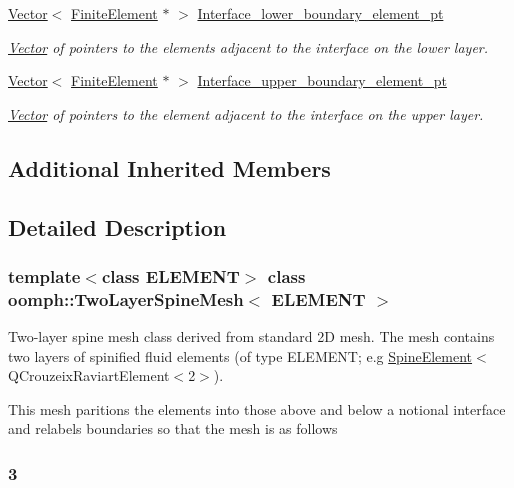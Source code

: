 \begin{DoxyCompactItemize}
\hyperlink{classoomph_1_1Vector}{Vector}$<$ \hyperlink{classoomph_1_1FiniteElement}{Finite\+Element} $\ast$ $>$ \hyperlink{classoomph_1_1TwoLayerSpineMesh_aaa5c2ad2f61cd7637b12573265b42bd7}{Interface\+\_\+lower\+\_\+boundary\+\_\+element\+\_\+pt}
\begin{DoxyCompactList}\small\item\em \hyperlink{classoomph_1_1Vector}{Vector} of pointers to the elements adjacent to the interface on the lower layer. \end{DoxyCompactList}\item 
\hyperlink{classoomph_1_1Vector}{Vector}$<$ \hyperlink{classoomph_1_1FiniteElement}{Finite\+Element} $\ast$ $>$ \hyperlink{classoomph_1_1TwoLayerSpineMesh_a81c2202c3169f9fe8c9342b5d95c1a9d}{Interface\+\_\+upper\+\_\+boundary\+\_\+element\+\_\+pt}
\begin{DoxyCompactList}\small\item\em \hyperlink{classoomph_1_1Vector}{Vector} of pointers to the element adjacent to the interface on the upper layer. \end{DoxyCompactList}\end{DoxyCompactItemize}
\subsection*{Additional Inherited Members}


\subsection{Detailed Description}
\subsubsection*{template$<$class E\+L\+E\+M\+E\+NT$>$\newline
class oomph\+::\+Two\+Layer\+Spine\+Mesh$<$ E\+L\+E\+M\+E\+N\+T $>$}

Two-\/layer spine mesh class derived from standard 2D mesh. The mesh contains two layers of spinified fluid elements (of type E\+L\+E\+M\+E\+NT; e.\+g \hyperlink{classoomph_1_1SpineElement}{Spine\+Element}$<$Q\+Crouzeix\+Raviart\+Element$<$2$>$).

This mesh paritions the elements into those above and below a notional interface and relabels boundaries so that the mesh is as follows \subsubsection*{3 }

